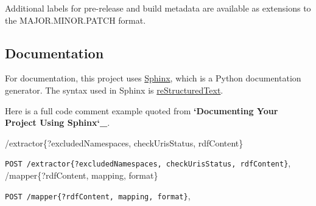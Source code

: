 \documentclass[letterpaper,10pt,english]{sphinxmanual}
\begin{document}
Additional labels for pre-release and build metadata are available as extensions to the MAJOR.MINOR.PATCH format.


\subsection{Documentation}
\label{docs/convensions:documentation}
For documentation, this project uses \href{http://sphinx-doc.org/}{Sphinx}, which is a Python documentation generator.
The syntax used in Sphinx is \href{http://docutils.sourceforge.net/rst.html}{reStructuredText}.

Here is a full code comment example quoted from {\color{red}\bfseries{}{}`Documenting Your Project Using Sphinx{}`\_}.


\renewcommand{\indexname}{HTTP Routing Table}
\begin{theindex}
\def\bigletter#1{{\Large\sffamily#1}\nopagebreak\vspace{1mm}}
\bigletter{/extractor\{?excludedNamespaces, checkUrisStatus, rdfContent\}}
\item {\texttt{POST /extractor\{?excludedNamespaces, checkUrisStatus, rdfContent\}}}, \pageref{docs/extractor:post--extractor_?excludedNamespaces, checkUrisStatus, rdfContent_}
\indexspace
\bigletter{/mapper\{?rdfContent, mapping, format\}}
\item {\texttt{POST /mapper\{?rdfContent, mapping, format\}}}, \pageref{docs/mapper:post--mapper_?rdfContent, mapping, format_}
\end{theindex}

\renewcommand{\indexname}{Index}
\printindex
\end{document}
